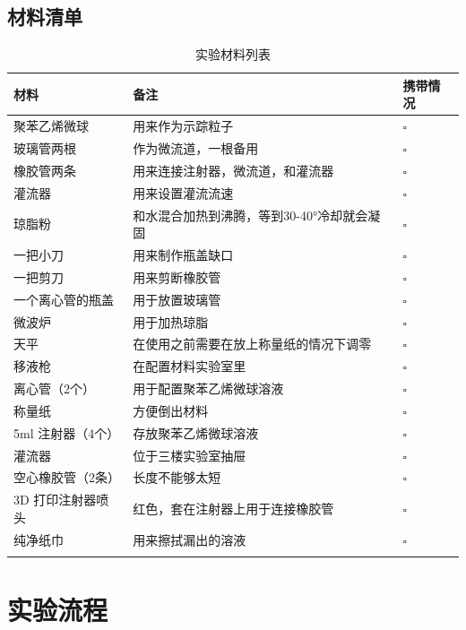 \documentclass[12pt]{article}
\begin{document}
\subsection{材料清单}
{
    \footnotesize
    \begin{longtable}{@{} p{5cm} p{10cm} p{2cm} @{}}
        \toprule
        \textbf{材料} & \textbf{备注} & \textbf{携带情况} \\ 
        \midrule
        聚苯乙烯微球 & 用来作为示踪粒子 & $\square$ \\ 
        玻璃管两根 & 作为微流道，一根备用 & $\square$ \\ 
        橡胶管两条 & 用来连接注射器，微流道，和灌流器 & $\square$ \\ 
        灌流器 & 用来设置灌流流速 & $\square$ \\ 
        琼脂粉 & 和水混合加热到沸腾，等到30-40°冷却就会凝固 & $\square$ \\ 
        一把小刀 & 用来制作瓶盖缺口 & $\square$ \\ 
        一把剪刀 & 用来剪断橡胶管 & $\square$ \\ 
        一个离心管的瓶盖 & 用于放置玻璃管 & $\square$ \\ 
        微波炉 & 用于加热琼脂 & $\square$ \\ 
        天平 & 在使用之前需要在放上称量纸的情况下调零 & $\square$ \\ 
        移液枪 & 在配置材料实验室里 & $\square$\\ 
        离心管（2个） & 用于配置聚苯乙烯微球溶液 & $\square$ \\ 
        称量纸 & 方便倒出材料 & $\square$\\ 
        5ml 注射器（4个） & 存放聚苯乙烯微球溶液 & $\square$ \\ 
        灌流器 & 位于三楼实验室抽屉 & $\square$ \\ 
        空心橡胶管（2条） & 长度不能够太短 & $\square$ \\ 
        3D 打印注射器喷头 & 红色，套在注射器上用于连接橡胶管 & $\square$ \\ 
        纯净纸巾 & 用来擦拭漏出的溶液 & $\square$ \\ 
        \bottomrule
        \caption{实验材料列表}
    \end{longtable}
    
}

\section{实验流程}
\end{document}
